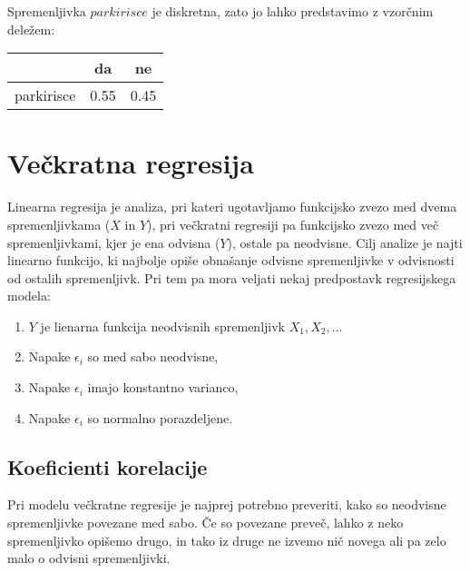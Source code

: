 \documentclass[a4paper, 12pt]{article}
\begin{document}
Spremenljivka $ parkirisce $ je diskretna, zato jo lahko predstavimo z
vzorčnim deležem:

\begin{center}
\begin{tabular}{ c|cc }
	& da & ne \\
	\hline
	parkirisce & 0.55 & 0.45 \\
\end{tabular}
\end{center}

\section{Večkratna regresija}

Linearna regresija je analiza, pri kateri ugotavljamo funkcijsko zvezo med
dvema spremenljivkama ($ X $ in $ Y $), pri večkratni regresiji pa funkcijsko
zvezo med več spremenljivkami, kjer je ena odvisna ($ Y $), ostale pa neodvisne.
Cilj analize je najti linearno funkcijo, ki najbolje opiše obnašanje odvisne
spremenljivke v odvisnosti od ostalih spremenljivk. Pri tem pa mora veljati
nekaj predpostavk regresijskega modela:
\begin{enumerate}
	\item $ Y $ je lienarna funkcija neodvisnih spremenljivk $ X_{1}, X_{2}, \dots $
	\item Napake $ \epsilon_{i} $ so med sabo neodvisne,
	\item Napake $ \epsilon_{i} $ imajo konstantno varianco,
	\item Napake $ \epsilon_{i} $ so normalno porazdeljene.
\end{enumerate}

\subsection{Koeficienti korelacije}

Pri modelu večkratne regresije je najprej potrebno preveriti, kako so
neodvisne spremenljivke povezane med sabo. Če so povezane preveč, lahko z neko
spremenljivko opišemo drugo, in tako iz druge ne izvemo nič novega ali pa zelo
malo o odvisni spremenljivki.
\end{document}
